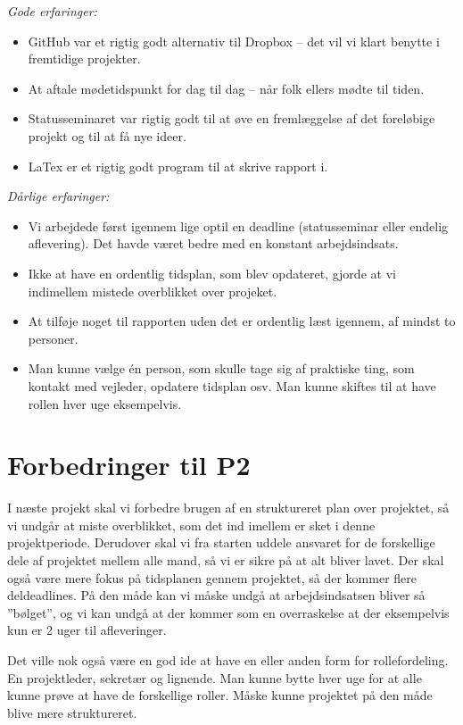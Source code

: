 \emph{Gode erfaringer:}
\begin {itemize}
\item  GitHub var et rigtig godt alternativ til Dropbox – det vil vi klart benytte i fremtidige projekter.

\item	At aftale mødetidspunkt for dag til dag – når folk ellers mødte til tiden. 

\item	Statusseminaret var rigtig godt til at øve en fremlæggelse af det foreløbige projekt og til at få nye ideer.

\item	LaTex er et rigtig godt program til at skrive rapport i.
\end{itemize}\emph{Dårlige erfaringer:}
\begin{itemize}
\item	Vi arbejdede først igennem lige optil en deadline (statusseminar eller endelig aflevering). Det havde været bedre med en konstant arbejdsindsats. 

\item	Ikke at have en ordentlig tidsplan, som blev opdateret, gjorde at vi indimellem mistede overblikket over projeket. 

\item	At tilføje noget til rapporten uden det er ordentlig læst igennem, af mindst to personer.

\item	Man kunne vælge én person, som skulle tage sig af praktiske ting, som kontakt med vejleder, opdatere tidsplan osv. Man kunne skiftes til at have rollen hver uge eksempelvis. 
\end{itemize}

\section{Forbedringer til P2}

I næste projekt skal vi forbedre brugen af en struktureret plan over projektet, så vi undgår at miste overblikket, som det ind imellem er sket i denne projektperiode. Derudover skal vi fra starten uddele ansvaret for de forskellige dele af projektet mellem alle mand, så vi er sikre på at alt bliver lavet. Der skal også være mere fokus på tidsplanen gennem projektet, så der kommer flere deldeadlines. På den måde kan vi måske undgå at arbejdsindsatsen bliver så ”bølget”, og vi kan undgå at der kommer som en overraskelse at der eksempelvis kun er 2 uger til afleveringer.

Det ville nok også være en god ide at have en eller anden form for rollefordeling. En projektleder, sekretær og lignende. Man kunne bytte hver uge for at alle kunne prøve at have de forskellige roller. Måske kunne projektet på den måde blive mere struktureret.
